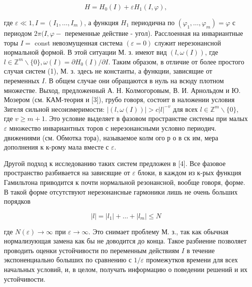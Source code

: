 \documentclass[10pt]{article}
\begin{document}
\[

H=H_{0}(I)+\varepsilon H_{1}(I, \varphi),

\]



где $\varepsilon \ll 1, I=\left(I_{1}, \ldots, I_{m}\right)$, а функция $H_{1}$ периодична по $\left(\varphi_{1}, \ldots, \varphi_{m}\right)=\varphi$ с периодом $2 \pi(I, \varphi-$ переменные действие - угол). Расслоенная на инвариантные торы $I=$ const невозмущенная система $(\varepsilon=0)$ служит нерезонансной нормальной формой. В этой ситуации М. з. имеют вид $(l, \omega(I))$, где $l \in \mathbb{Z}^{m} \backslash\{0\}, \omega(I)=\partial H_{0}(I) / \partial I$. Таким образом, в отличие от более простого случая систем (1), М. з. здесь не константы, а функции, зависящие от переменных $I$. В общем случае они обращаются в нуль на всюду плотном множестве. Выход, предложенный А. Н. Колмогоровым, В. И. Арнольдом и Ю. Мозером (см. КАМ-теория и [3]), грубо говоря, состоит в наложении условия Зигеля сильной несоизмеримости: $|(l, \omega(I))|>c|l|^{-v}$ для всех $l \in \mathbb{Z}^{m} \backslash\{0\}$, где $v \geqslant m+1$. Это условие выделяет в фазовом пространстве системы при малых $\varepsilon$ множество инвариантных торов с нерезонансными условно периодич. движениями (см. Обмотка тора), называемое колм ого р о в ск им, мера дополнения к к-рому мала вместе с $\varepsilon$.



Другой подход к исследованию таких систем предложен в [4]. Все фазовое пространство разбивается на зависящие от $\varepsilon$ блоки, в каждом из к-рых функция Гамильтона приводится к почти нормальной резонансной, вообще говоря, форме. В такой форме отсутствуют нерезонансные гармоники лишь не очень больших порядков



\[

|l|=\left|l_{1}\right|+\ldots+\left|l_{m}\right| \leqslant N

\]



где $N(\varepsilon) \rightarrow \infty$ при $\varepsilon \rightarrow \infty$. Это снимает проблему М. з., так как обычная нормализующая замена как бы не доводится до конца. Такое разбиение позволяет проводить оценки устойчивости по переменным действиям $I$ в течение экспоненциально болыших по сравнению с $1 / \varepsilon$ промежутков времени для всех начальных условий, и, в целом, получать информацию о поведении решений и их устойчивости.
\end{document}
